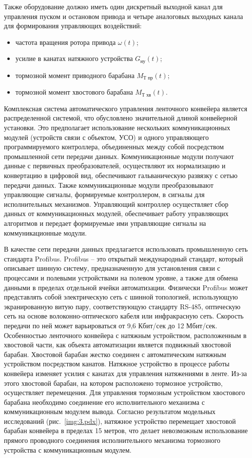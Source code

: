 Также оборудование должно иметь один дискретный выходной канал для управления пуском и остановом привода и четыре аналоговых выходных канала для формирования управляющих воздействий:
\begin{itemize}
\item частота вращения ротора привода $ \omega(t) $;
\item усилие в канатах натяжного устройства $ G_{\text{ну}}(t) $;
\item тормозной момент приводного барабана $ M_\text{Т пр}(t) $;
\item тормозной момент хвостового барабана $ M_\text{Т хв}(t) $.
\end{itemize}

Комплексная система автоматического управления ленточного конвейера является распределенной системой, что обусловлено значительной длиной конвейерной установки. Это предполагает использование нескольких коммуникационных модулей (устройств связи с объектом, УСО) и одного управляющего программируемого контроллера, объединенных между собой посредством промышленной сети передачи данных. Коммуникационные модули получают данные с первичных преобразователей, осуществляют их нормализацию и конвертацию в цифровой вид, обеспечивают гальваническую развязку с сетью передачи данных. Также коммуникационные модули преобразовывают управляющие сигналы, формируемые контроллером, в сигналы для исполнительных механизмов. Управляющий контроллер осуществляет сбор данных от коммуникационных модулей, обеспечивает работу управляющих алгоритмов и передает формируемые ими управляющие сигналы на коммуникационные модули.

В качестве сети передачи данных предлагается использовать промышленную сеть стандарта Profibus. Profibus -- это открытый международный стандарт, который описывает шинную систему, предназначенную для установления связи с процессами и полевыми устройствами на полевом уровне, а также для обмена данными в пределах отдельной ячейки автоматизации. Физически Profibus может представлять собой электрическую сеть с шинной топологией, использующую экранированную витую пару, соответствующую стандарту RS-485, оптическую сеть на основе волоконно-оптического кабеля или инфракрасную сеть. Скорость передачи по ней может варьироваться от 9,6 Кбит/сек до 12 Мбит/сек.\\

Особенностью ленточного конвейера с натяжным устройством, расположенным в хвостовой части, как объекта автоматизации является подвижный хвостовой барабан. Хвостовой барабан жестко соединен с автоматическим натяжным устройством посредством канатов. Натяжное устройство в процессе работы конвейера изменяет усилия с канатах для управления натяжениями в ленте. Из-за этого хвостовой барабан, на котором расположено тормозное устройство, осуществляет перемещения. Для управления тормозным устройством хвостового барабана необходимо соединение его исполнительного механизма с коммуникационным модулем вывода. Согласно результатом модельных исследований (рис.~\ref{img:3.pdx}), натяжное устройство перемещает хвостовой барабан конвейера в пределах 15 метров, что делает невозможным использование прямого проводного соединения исполнительного механизма тормозного устройства с коммуникационным модулем.

